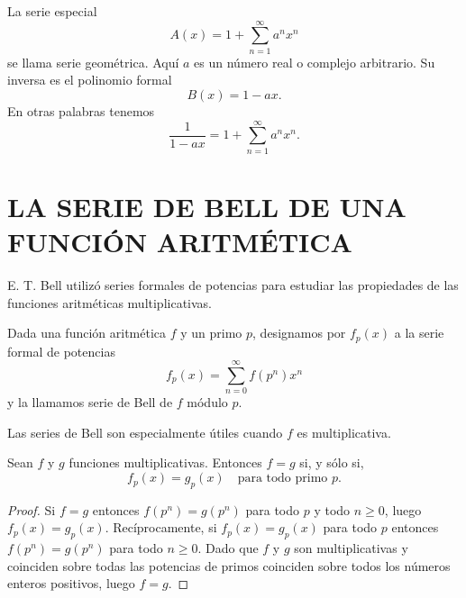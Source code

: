 \documentclass[12pt,a4paper]{book}
\begin{document}
    La serie especial
    \begin{equation*}
        A(x)=1+\sum_{n=1}^{\infty}a^nx^n
    \end{equation*}
    se llama serie geométrica. Aquí $a$ es un número real o complejo arbitrario. Su inversa
    es el polinomio formal
    \begin{equation*}
        B(x)=1-ax.
    \end{equation*}
    En otras palabras tenemos
    \begin{equation*}
        \frac{1}{1-ax}=1+\sum_{n=1}^{\infty}a^nx^n.
    \end{equation*}

    \section{LA SERIE DE BELL DE UNA FUNCIÓN ARITMÉTICA}

    E. T. Bell utilizó series formales de potencias para estudiar las propiedades de las
    funciones aritméticas multiplicativas.

    \begin{definicion}
        Dada una función aritmética $f$ y un primo $p$, designamos por $f_p(x)$ a la serie
        formal de potencias
        \begin{equation*}
            f_p(x)=\sum_{n=0}^{\infty}f(p^n)x^n
        \end{equation*}
        y la llamamos serie de Bell de $f$ módulo $p$.
    \end{definicion}

    Las series de Bell son especialmente útiles cuando $f$ es multiplicativa.

    \begin{teorema}
        Sean $f$ y $g$ funciones multiplicativas. Entonces $f=g$ si, y sólo si,
        \begin{equation*}
            f_p(x)=g_p(x)\quad\text{para todo primo } p.
        \end{equation*}
    \end{teorema}

    \begin{proof}
        Si $f=g$ entonces $f(p^n)=g(p^n)$ para todo $p$ y todo $n\geq0$, luego
        $f_p(x)=g_p(x)$. Recíprocamente, si $f_p(x)=g_p(x)$ para todo $p$ entonces
        $f(p^n)=g(p^n)$ para todo $n\geq0$. Dado que $f$ y $g$ son multiplicativas y
        coinciden sobre todas las potencias de primos coinciden sobre todos los números
        enteros positivos, luego $f=g$.
    \end{proof}
\end{document}
